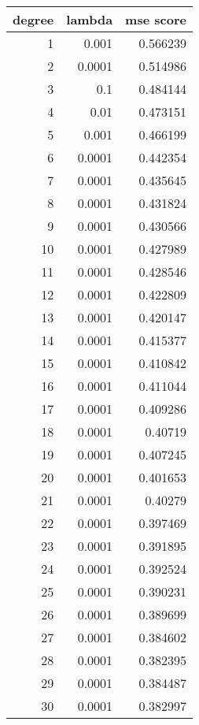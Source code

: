 \begin{tabular}{rrr}
\hline
   degree &   lambda &   mse score \\
\hline
        1 &   0.001  &    0.566239 \\
        2 &   0.0001 &    0.514986 \\
        3 &   0.1    &    0.484144 \\
        4 &   0.01   &    0.473151 \\
        5 &   0.001  &    0.466199 \\
        6 &   0.0001 &    0.442354 \\
        7 &   0.0001 &    0.435645 \\
        8 &   0.0001 &    0.431824 \\
        9 &   0.0001 &    0.430566 \\
       10 &   0.0001 &    0.427989 \\
       11 &   0.0001 &    0.428546 \\
       12 &   0.0001 &    0.422809 \\
       13 &   0.0001 &    0.420147 \\
       14 &   0.0001 &    0.415377 \\
       15 &   0.0001 &    0.410842 \\
       16 &   0.0001 &    0.411044 \\
       17 &   0.0001 &    0.409286 \\
       18 &   0.0001 &    0.40719  \\
       19 &   0.0001 &    0.407245 \\
       20 &   0.0001 &    0.401653 \\
       21 &   0.0001 &    0.40279  \\
       22 &   0.0001 &    0.397469 \\
       23 &   0.0001 &    0.391895 \\
       24 &   0.0001 &    0.392524 \\
       25 &   0.0001 &    0.390231 \\
       26 &   0.0001 &    0.389699 \\
       27 &   0.0001 &    0.384602 \\
       28 &   0.0001 &    0.382395 \\
       29 &   0.0001 &    0.384487 \\
       30 &   0.0001 &    0.382997 \\
\hline
\end{tabular}
